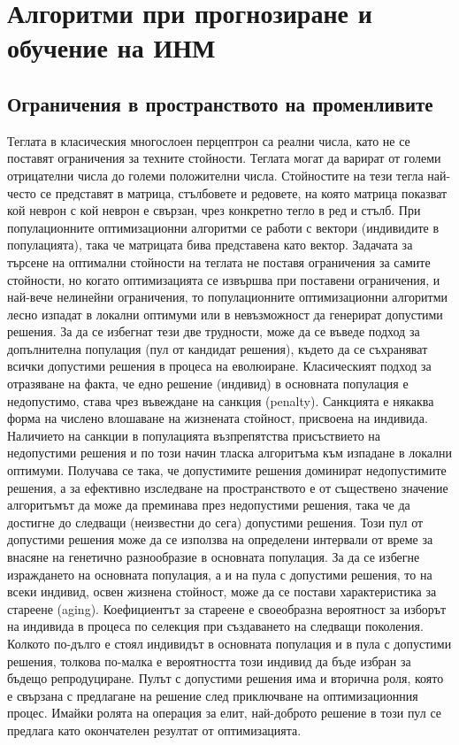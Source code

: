 \chapter{Алгоритми при прогнозиране и обучение на ИНМ}

\section{Ограничения в пространството на променливите}

Теглата в класическия многослоен перцептрон са реални числа, като не се поставят ограничения за техните стойности. Теглата могат да варират от големи отрицателни числа до големи положителни числа. Стойностите на тези тегла най-често се представят в матрица, стълбовете и редовете, на която матрица показват кой неврон с кой неврон е свързан, чрез конкретно тегло в ред и стълб. При популационните оптимизационни алгоритми се работи с вектори (индивидите в популацията), така че матрицата бива представена като вектор. Задачата за търсене на оптимални стойности на теглата не поставя ограничения за самите стойности, но когато оптимизацията се извършва при поставени ограничения, и най-вече нелинейни ограничения, то популационните оптимизационни алгоритми лесно изпадат в локални оптимуми или в невъзможност да генерират допустими решения. За да се избегнат тези две трудности, може да се въведе подход за допълнителна популация (пул от кандидат решения), където да се съхраняват всички допустими решения в процеса на еволюиране. Класическият подход за отразяване на факта, че едно решение (индивид) в основната популация е недопустимо, става чрез въвеждане на санкция (penalty). Санкцията е някаква форма на числено влошаване на жизнената стойност, присвоена на индивида. Наличието на санкции в популацията възпрепятства присъствието на недопустими решения и по този начин тласка алгоритъма към изпадане в локални оптимуми. Получава се така, че допустимите решения доминират недопустимите решения, а за ефективно изследване на пространството е от съществено значение алгоритъмът да може да преминава през недопустими решения, така че да достигне до следващи (неизвестни до сега) допустими решения. Този пул от допустими решения може да се използва на определени интервали от време за внасяне на генетично разнообразие в основната популация. За да се избегне израждането на основната популация, а и на пула с допустими решения, то на всеки индивид, освен жизнена стойност, може да се постави характеристика за стареене (aging). Коефициентът за стареене е своеобразна вероятност за изборът на индивида в процеса по селекция при създаването на следващи поколения. Колкото по-дълго е стоял индивидът в основната популация и в пула с допустими решения, толкова по-малка е вероятността този индивид да бъде избран за бъдещо репродуциране. Пулът с допустими решения има и вторична роля, която е свързана с предлагане на решение след приключване на оптимизационния процес. Имайки ролята на операция за елит, най-доброто решение в този пул се предлага като окончателен резултат от оптимизацията. 

